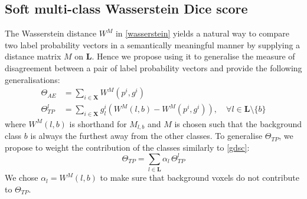 \documentclass[runningheads,orivec,a4paper]{llncs}
\begin{document}
\subsection{Soft multi-class Wasserstein Dice score}
The Wasserstein distance $W^M$ in \eqref{wasserstein} yields a natural way to 
compare two label probability vectors in a semantically meaningful
manner by supplying a distance matrix $M$ on $\mathbf{L}$.
%
Hence we propose using it
to generalise the
measure of disagreement between a pair of label probability vectors
and provide the following generalisations:
\begin{align}\label{wass_AE}
\Theta_{AE} &= \sum_{i \in \mathbf{X}} W^M(p^i, g^i) \\
\Theta_{TP}^l &= \sum_{i \in \mathbf{X}}g^i_l(W^M(l, b) - W^M(p^i, g^i)),
                \quad \forall l \in \mathbf{L}\setminus\{b\}
\end{align}
where $W^M(l, b)$ is shorthand for $M_{l,b}$ and $M$ is
chosen such that the background class $b$ is always the furthest away
from the other classes. 
To generalise $\Theta_{TP}$, we propose to
weight the contribution of the classes similarly to
\eqref{gdsc}: 
\begin{equation}\label{wass_TP}
\Theta_{TP} = \sum_{l \in \mathbf{L}} \alpha_{l} \,\Theta_{TP}^l
\end{equation}
We chose
$\alpha_{l}=W^M(l, b)$ to make sure that background voxels do not contribute to $\Theta_{TP}$.
\end{document}
